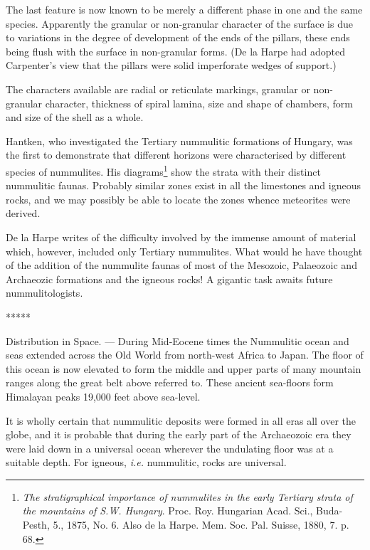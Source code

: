 \documentclass[a4paper, 12pt, oneside]{article}
\begin{document}
The last feature is now known to be merely a different phase in one and the same species. Apparently the granular or non-granular character of the surface is due to variations in the degree of development of the ends of the pillars, these ends being flush with the surface in non-granular forms. (De la Harpe had adopted Carpenter's view that the pillars were solid imperforate wedges of support.)

The characters available are radial or reticulate markings, granular or non-granular character, thickness of spiral lamina, size and shape of chambers, form and size of the shell as a whole.

Hantken, who investigated the Tertiary nummulitic formations of Hungary, was the first to demonstrate that different horizons were characterised by different species of nummulites. His diagrams\footnote{\emph{The stratigraphical importance of nummulites in the early Tertiary strata of the mountains of S.W. Hungary}. Proc. Roy. Hungarian Acad. Sci., Buda-Pesth, 5., 1875, No. 6. Also de la Harpe. Mem. Soc. Pal. Suisse, 1880, 7. p. 68.} show the strata with their distinct nummulitic faunas. Probably similar zones exist in all the limestones and igneous rocks, and we may possibly be able to locate the zones whence meteorites were derived.

De la Harpe writes of the difficulty involved by the immense amount of material which, however, included only Tertiary nummulites. What would he have thought of the addition of the nummulite faunas of most of the Mesozoic, Palaeozoic and Archaeozic formations and the igneous rocks! A gigantic task awaits future nummulitologists.

\centerline{*\hspace{15mm}*\hspace{15mm}*\hspace{15mm}*\hspace{15mm}*}
\bigskip

Distribution in Space. --- During Mid-Eocene times the Nummulitic ocean and seas extended across the Old World from north-west Africa to Japan. The floor of this ocean is now elevated to form the middle and upper parts of many mountain ranges along the great belt above referred to. These ancient sea-floors form Himalayan peaks 19,000 feet above sea-level.

It is wholly certain that nummulitic deposits were formed in all eras all over the globe, and it is probable that during the early part of the Archaeozoic era they were laid down in a universal ocean wherever the undulating floor was at a suitable depth. For igneous, \emph{i.e.} nummulitic, rocks are universal.
\end{document}
